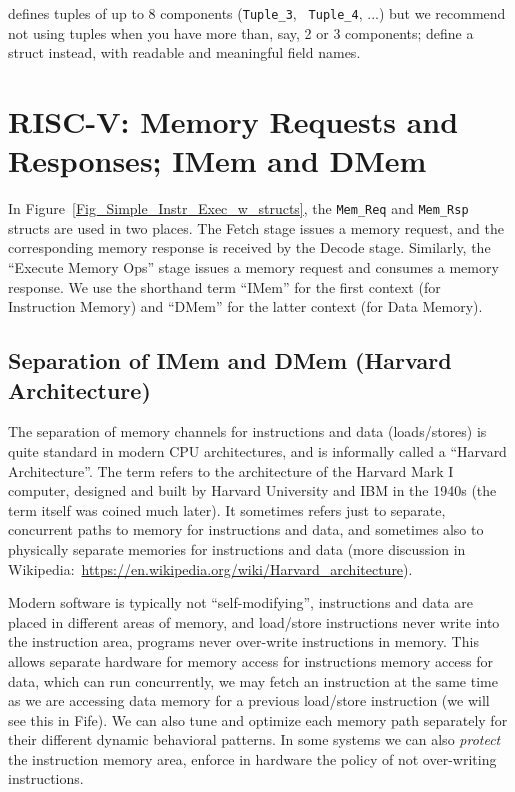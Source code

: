 {\BSV} defines tuples of up to 8 components ({\tt Tuple\_3}, {\tt
Tuple\_4}, ...) but we recommend not using tuples when you have more
than, say, 2 or 3 components; define a struct instead, with readable
and meaningful field names.


\section{RISC-V: Memory Requests and Responses; IMem and DMem}


In Figure~\ref{Fig_Simple_Instr_Exec_w_structs}, the \verb|Mem_Req|
and \verb|Mem_Rsp| structs are used in two places.  The Fetch stage
issues a memory request, and the corresponding memory response is
received by the Decode stage.  Similarly, the ``Execute Memory Ops''
stage issues a memory request and consumes a memory response.  We use
the shorthand term ``IMem'' for the first context (for Instruction
Memory) and ``DMem'' for the latter context (for Data Memory).


\subsection{Separation of IMem and DMem (Harvard Architecture)}

\label{Sec_Harvard_architecture}


The separation of memory channels for instructions and data
(loads/stores) is quite standard in modern CPU architectures, and is
informally called a ``Harvard Architecture''.  The term refers to the
architecture of the Harvard Mark I computer, designed and built by
Harvard University and IBM in the 1940s (the term itself was coined
much later).  It sometimes refers just to separate, concurrent paths
to memory for instructions and data, and sometimes also to physically
separate memories for instructions and data (more discussion in
Wikipedia:~\url{https://en.wikipedia.org/wiki/Harvard_architecture}).

Modern software is typically not ``self-modifying'', {\ie}
instructions and data are placed in different areas of memory, and
load/store instructions never write into the instruction area, {\ie}
programs never over-write instructions in memory.  This allows
separate hardware for memory access for instructions {\vs} memory
access for data, which can run concurrently, {\ie} we may fetch an
instruction at the same time as we are accessing data memory for a
previous load/store instruction (we will see this in Fife).  We can
also tune and optimize each memory path separately for their different
dynamic behavioral patterns.  In some systems we can also
\emph{protect} the instruction memory area, {\ie} enforce in hardware
the policy of not over-writing instructions.

